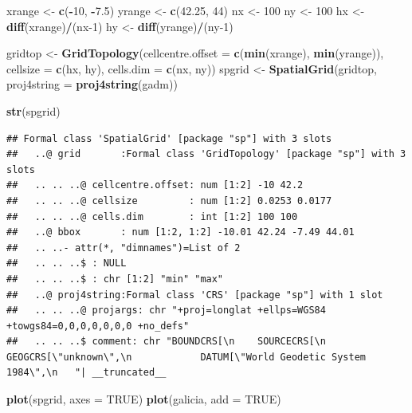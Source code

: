 \documentclass[
]{book}
\newenvironment{Shaded}{\begin{snugshade}}{\end{snugshade}}
\newcommand{\AttributeTok}[1]{\textcolor[rgb]{0.13,0.29,0.53}{#1}}
\newcommand{\ConstantTok}[1]{\textcolor[rgb]{0.56,0.35,0.01}{#1}}
\newcommand{\DecValTok}[1]{\textcolor[rgb]{0.00,0.00,0.81}{#1}}
\newcommand{\FloatTok}[1]{\textcolor[rgb]{0.00,0.00,0.81}{#1}}
\newcommand{\FunctionTok}[1]{\textcolor[rgb]{0.13,0.29,0.53}{\textbf{#1}}}
\newcommand{\NormalTok}[1]{#1}
\newcommand{\OtherTok}[1]{\textcolor[rgb]{0.56,0.35,0.01}{#1}}
\newcommand{\SpecialCharTok}[1]{\textcolor[rgb]{0.81,0.36,0.00}{\textbf{#1}}}
\theoremstyle{break}
\theoremstyle{definition}
\theoremstyle{definition}
\theoremstyle{definition}
\theoremstyle{definition}
\theoremstyle{remark}
\begin{document}
\begin{Shaded}
\begin{Highlighting}[]
\NormalTok{xrange }\OtherTok{\textless{}{-}} \FunctionTok{c}\NormalTok{(}\SpecialCharTok{{-}}\DecValTok{10}\NormalTok{, }\SpecialCharTok{{-}}\FloatTok{7.5}\NormalTok{)}
\NormalTok{yrange }\OtherTok{\textless{}{-}} \FunctionTok{c}\NormalTok{(}\FloatTok{42.25}\NormalTok{, }\DecValTok{44}\NormalTok{)}
\NormalTok{nx }\OtherTok{\textless{}{-}} \DecValTok{100}
\NormalTok{ny }\OtherTok{\textless{}{-}} \DecValTok{100}
\NormalTok{hx }\OtherTok{\textless{}{-}} \FunctionTok{diff}\NormalTok{(xrange)}\SpecialCharTok{/}\NormalTok{(nx}\DecValTok{{-}1}\NormalTok{)}
\NormalTok{hy }\OtherTok{\textless{}{-}} \FunctionTok{diff}\NormalTok{(yrange)}\SpecialCharTok{/}\NormalTok{(ny}\DecValTok{{-}1}\NormalTok{)}

\NormalTok{gridtop }\OtherTok{\textless{}{-}} \FunctionTok{GridTopology}\NormalTok{(}\AttributeTok{cellcentre.offset =} \FunctionTok{c}\NormalTok{(}\FunctionTok{min}\NormalTok{(xrange), }\FunctionTok{min}\NormalTok{(yrange)),}
                        \AttributeTok{cellsize =} \FunctionTok{c}\NormalTok{(hx, hy), }\AttributeTok{cells.dim =} \FunctionTok{c}\NormalTok{(nx, ny))}
\NormalTok{spgrid }\OtherTok{\textless{}{-}}  \FunctionTok{SpatialGrid}\NormalTok{(gridtop, }\AttributeTok{proj4string =} \FunctionTok{proj4string}\NormalTok{(gadm))}

\FunctionTok{str}\NormalTok{(spgrid)}
\end{Highlighting}
\end{Shaded}

\begin{verbatim}
## Formal class 'SpatialGrid' [package "sp"] with 3 slots
##   ..@ grid       :Formal class 'GridTopology' [package "sp"] with 3 slots
##   .. .. ..@ cellcentre.offset: num [1:2] -10 42.2
##   .. .. ..@ cellsize         : num [1:2] 0.0253 0.0177
##   .. .. ..@ cells.dim        : int [1:2] 100 100
##   ..@ bbox       : num [1:2, 1:2] -10.01 42.24 -7.49 44.01
##   .. ..- attr(*, "dimnames")=List of 2
##   .. .. ..$ : NULL
##   .. .. ..$ : chr [1:2] "min" "max"
##   ..@ proj4string:Formal class 'CRS' [package "sp"] with 1 slot
##   .. .. ..@ projargs: chr "+proj=longlat +ellps=WGS84 +towgs84=0,0,0,0,0,0,0 +no_defs"
##   .. .. ..$ comment: chr "BOUNDCRS[\n    SOURCECRS[\n        GEOGCRS[\"unknown\",\n            DATUM[\"World Geodetic System 1984\",\n   "| __truncated__
\end{verbatim}

\begin{Shaded}
\begin{Highlighting}[]
\FunctionTok{plot}\NormalTok{(spgrid, }\AttributeTok{axes =} \ConstantTok{TRUE}\NormalTok{)}
\FunctionTok{plot}\NormalTok{(galicia, }\AttributeTok{add =} \ConstantTok{TRUE}\NormalTok{)}
\end{Highlighting}
\end{Shaded}
\end{document}
